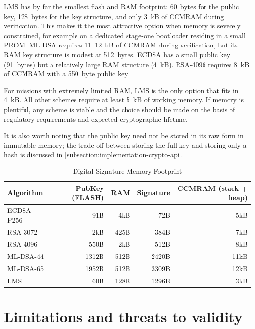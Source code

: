 LMS has by far the smallest flash and RAM footprint: 60~bytes for the public key, 128~bytes for the key structure, and only 3~kB of CCMRAM during verification. This makes it the most attractive option when memory is severely constrained, for example on a dedicated stage-one bootloader residing in a small PROM. ML-DSA requires 11--12~kB of CCMRAM during verification, but its RAM key structure is modest at 512~bytes. ECDSA has a small public key (91~bytes) but a relatively large RAM structure (4~kB). RSA-4096 requires 8~kB of CCMRAM with a 550~byte public key.

For missions with extremely limited RAM, LMS is the only option that fits in 4~kB. All other schemes require at least 5~kB of working memory. If memory is plentiful, any scheme is viable and the choice should be made on the basis of regulatory requirements and expected cryptographic lifetime.

It is also worth noting that the public key need not be stored in its raw form in immutable memory; the trade-off between storing the full key and storing only a hash is discussed in \autoref{subsection:implementation-crypto-api}.

\begin{table}[h]
\centering
\begin{tabular}{|l|r|r|r|r|}
\hline
\textbf{Algorithm} & \textbf{PubKey (FLASH)} & \textbf{RAM} & \textbf{Signature}  & \textbf{CCMRAM (stack + heap)} \\
\hline
ECDSA-P256  & 91B   & 4kB   & 72B   & 5kB \\
RSA-3072    & 2kB   & ~425B & 384B  & 7kB \\
RSA-4096    & ~550B & 2kB   & 512B  & 8kB \\
ML-DSA-44   & 1312B & 512B  & 2420B & 11kB \\
ML-DSA-65   & 1952B & 512B  & 3309B & 12kB \\
LMS         & 60B   & 128B  & 1296B & 3kB \\

\hline
\end{tabular}
\caption{Digital Signature Memory Footprint}
\label{tab:sig_verification_memory}
\end{table}


\section{Limitations and threats to validity}
\label{section:eval-limitations}

